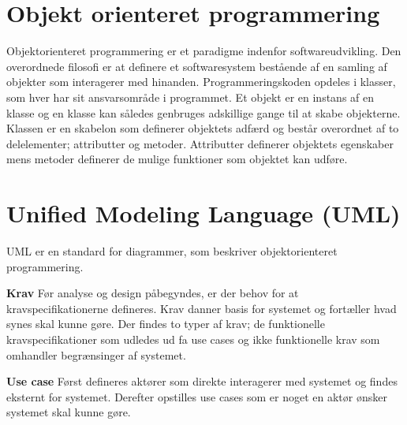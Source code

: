 
\section{Objekt orienteret programmering}

Objektorienteret programmering er et paradigme indenfor softwareudvikling. Den overordnede filosofi er at definere et softwaresystem bestående af en samling af objekter som interagerer med hinanden.  Programmeringskoden opdeles i klasser, som hver har sit ansvarsområde i programmet. Et objekt er en instans af en klasse og en klasse kan således genbruges adskillige gange til at skabe objekterne. Klassen er en skabelon som definerer objektets adfærd og består overordnet af to delelementer; attributter og metoder. Attributter definerer objektets egenskaber mens metoder definerer de mulige funktioner som objektet kan udføre. \cite{Dathan}  

\section{Unified Modeling Language (UML)}

UML er en standard for diagrammer, som beskriver objektorienteret programmering.

\textbf{Krav} Før analyse og design påbegyndes, er der behov for at kravspecifikationerne defineres. Krav danner basis for systemet og fortæller hvad synes skal kunne gøre. Der findes to typer af krav; de funktionelle kravspecifikationer som udledes ud fa use cases og ikke funktionelle krav som omhandler begrænsinger af systemet. 

\textbf{Use case} Først defineres aktører som direkte interagerer med systemet og findes eksternt for systemet. Derefter opstilles use cases som er noget en aktør ønsker systemet skal kunne gøre. 

